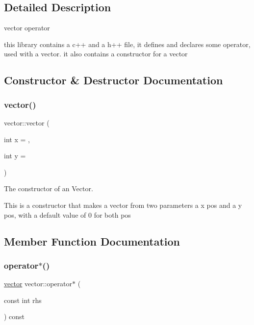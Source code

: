 \subsection{Detailed Description}
vector operator 

this library contains a c++ and a h++ file, it defines and declares some operator, used with a vector. it also contains a constructor for a vector 

\subsection{Constructor \& Destructor Documentation}
\mbox{\label{classvector_ada69c108ec9393e6f70bdfcd58366cbf}} 
\subsubsection{\texorpdfstring{vector()}{vector()}}
{\footnotesize\ttfamily vector\+::vector (\begin{DoxyParamCaption}\item[{int}]{x = {},  }\item[{int}]{y = {} }\end{DoxyParamCaption})}



The constructor of an Vector. 

This is a constructor that makes a vector from two parameters a x pos and a y pos, with a default value of 0 for both pos 

\subsection{Member Function Documentation}
\mbox{\label{classvector_ad4e924ee21af1367f8724b2d94db110e}} 
\subsubsection{\texorpdfstring{operator$\ast$()}{operator*()}\hspace{0.1cm}{\footnotesize\ttfamily [1/2]}}
{\footnotesize\ttfamily \hyperlink{classvector}{vector} vector\+::operator$\ast$ (\begin{DoxyParamCaption}\item[{const int}]{rhs }\end{DoxyParamCaption}) const}




